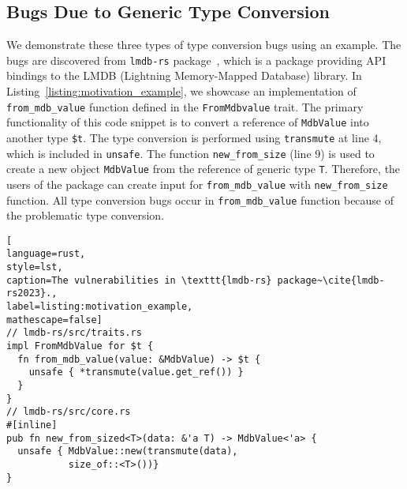 \begin{appendix}









































\section{Bugs Due to Generic Type Conversion} \label{sec:appendixB}


We demonstrate these three types of type conversion bugs using an example.
The bugs are discovered from \texttt{lmdb-rs} package~\cite{lmdb-rs2023}, which is a package providing API bindings to the LMDB (Lightning Memory-Mapped Database) library. 
In Listing~\ref{listing:motivation_example}, we showcase an implementation of \texttt{from\_mdb\_value} function defined in the \texttt{FromMdbvalue} trait. 
The primary functionality of this code snippet is to convert a reference of \texttt{MdbValue} into another type \texttt{\$t}.
The type conversion is performed using \texttt{transmute} at line 4, which is included in \texttt{unsafe}. 
The function \texttt{new\_from\_size} (line 9) is used to create a new object \texttt{MdbValue} from the reference of generic type \texttt{T}. 
Therefore, the users of the package can create input for \texttt{from\_mdb\_value} with \texttt{new\_from\_size} function.
All type conversion bugs occur in \texttt{from\_mdb\_value} function because of the problematic type conversion.






\begin{lstlisting}[
language=rust, 
style=lst,
caption=The vulnerabilities in \texttt{lmdb-rs} package~\cite{lmdb-rs2023}.,
label=listing:motivation_example,
mathescape=false]
// lmdb-rs/src/traits.rs
impl FromMdbValue for $t {
  fn from_mdb_value(value: &MdbValue) -> $t {
    unsafe { *transmute(value.get_ref()) }
  }
}
// lmdb-rs/src/core.rs
#[inline]
pub fn new_from_sized<T>(data: &'a T) -> MdbValue<'a> {
  unsafe { MdbValue::new(transmute(data), 
           size_of::<T>())}
}
\end{lstlisting}





\end{appendix}
